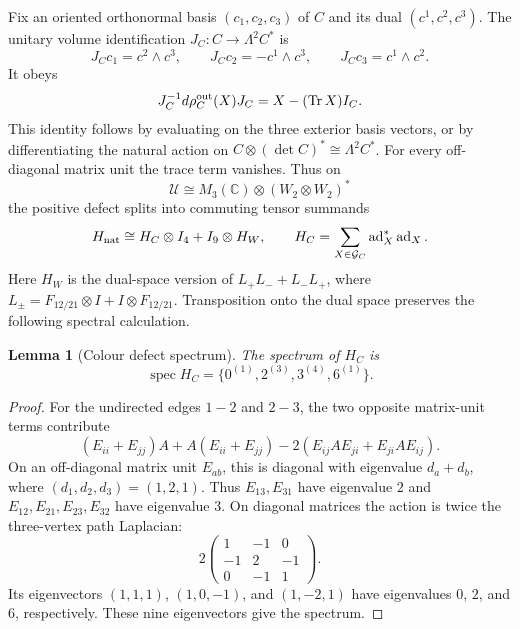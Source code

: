 \documentclass[11pt]{article}
\numberwithin{equation}{section}
\newtheorem{lemma}[theorem]{Lemma}
\theoremstyle{definition}
\theoremstyle{remark}
\newcommand{\C}{\mathbb C}
\newcommand{\Tr}{\operatorname{Tr}}
\newcommand{\spec}{\operatorname{spec}}
\begin{document}
Fix an oriented orthonormal basis $(c_1,c_2,c_3)$ of $C$ and its dual
$(c^1,c^2,c^3)$.  The unitary volume identification
$J_C:C\to\Lambda^2C^*$ is
\[
 J_Cc_1=c^2\wedge c^3,\qquad
 J_Cc_2=-c^1\wedge c^3,\qquad
 J_Cc_3=c^1\wedge c^2.
\]
It obeys
\begin{equation}
 J_C^{-1}d\rho_C^{\rm out}(X)J_C=X-(\Tr X)I_C.
 \label{eq:volume-infinitesimal-action}
\end{equation}
This identity follows by evaluating on the three exterior basis vectors,
or by differentiating the natural action on
$C\otimes(\det C)^*\cong\Lambda^2C^*$.
For every off-diagonal matrix unit the trace term vanishes.
Thus on
\[
 \mathscr U\cong M_3(\C)\otimes(W_2\otimes W_2)^*
\]
the positive defect splits into commuting tensor summands
\begin{equation}
 H_{\rm nat}\cong H_C\otimes I_4+I_9\otimes H_W,
 \qquad H_C=\sum_{X\in\mathcal G_C}\operatorname{ad}_X^*
                                       \operatorname{ad}_X.
 \label{eq:naturality-tensor-sum}
\end{equation}
Here $H_W$ is the dual-space version of $L_+L_-+L_-L_+$, where
$L_\pm=F_{12/21}\otimes I+I\otimes F_{12/21}$.  Transposition onto
the dual space preserves the following spectral calculation.

\begin{lemma}[Colour defect spectrum]
\label{lem:colour-naturality-spectrum}
The spectrum of $H_C$ is
\begin{equation}
 \spec H_C=\{0^{(1)},2^{(3)},3^{(4)},6^{(1)}\}.
 \label{eq:colour-naturality-spectrum}
\end{equation}
\end{lemma}

\begin{proof}
For the undirected edges $1-2$ and $2-3$, the two opposite matrix-unit
terms contribute
\[
 (E_{ii}+E_{jj})A+A(E_{ii}+E_{jj})
       -2(E_{ij}AE_{ji}+E_{ji}AE_{ij}).
\]
On an off-diagonal matrix unit $E_{ab}$, this is diagonal with eigenvalue
$d_a+d_b$, where $(d_1,d_2,d_3)=(1,2,1)$.  Thus $E_{13},E_{31}$ have
eigenvalue $2$ and $E_{12},E_{21},E_{23},E_{32}$ have eigenvalue $3$.
On diagonal matrices the action is twice the three-vertex path Laplacian:
\[
 2\begin{pmatrix}1&-1&0\\-1&2&-1\\0&-1&1\end{pmatrix}.
\]
Its eigenvectors $(1,1,1)$, $(1,0,-1)$, and $(1,-2,1)$ have eigenvalues
$0$, $2$, and $6$, respectively.  These nine eigenvectors give the spectrum.
\end{proof}
\end{document}
